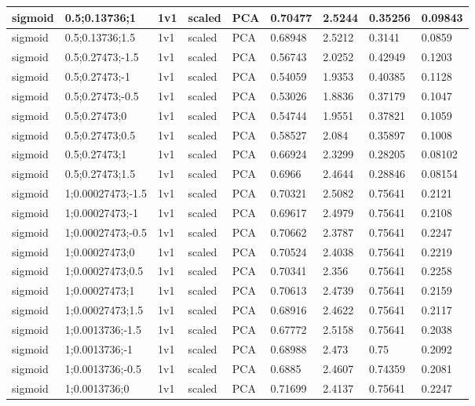 \begin{longtable}{lllllllll}
sigmoid & 0.5;0.13736;1 & 1v1 & scaled & PCA & 0.70477 & 2.5244 & 0.35256 & 0.09843\\ \hline
sigmoid & 0.5;0.13736;1.5 & 1v1 & scaled & PCA & 0.68948 & 2.5212 & 0.3141 & 0.0859\\ \hline
sigmoid & 0.5;0.27473;-1.5 & 1v1 & scaled & PCA & 0.56743 & 2.0252 & 0.42949 & 0.1203\\ \hline
sigmoid & 0.5;0.27473;-1 & 1v1 & scaled & PCA & 0.54059 & 1.9353 & 0.40385 & 0.1128\\ \hline
sigmoid & 0.5;0.27473;-0.5 & 1v1 & scaled & PCA & 0.53026 & 1.8836 & 0.37179 & 0.1047\\ \hline
sigmoid & 0.5;0.27473;0 & 1v1 & scaled & PCA & 0.54744 & 1.9551 & 0.37821 & 0.1059\\ \hline
sigmoid & 0.5;0.27473;0.5 & 1v1 & scaled & PCA & 0.58527 & 2.084 & 0.35897 & 0.1008\\ \hline
sigmoid & 0.5;0.27473;1 & 1v1 & scaled & PCA & 0.66924 & 2.3299 & 0.28205 & 0.08102\\ \hline
sigmoid & 0.5;0.27473;1.5 & 1v1 & scaled & PCA & 0.6966 & 2.4644 & 0.28846 & 0.08154\\ \hline
sigmoid & 1;0.00027473;-1.5 & 1v1 & scaled & PCA & 0.70321 & 2.5082 & 0.75641 & 0.2121\\ \hline
sigmoid & 1;0.00027473;-1 & 1v1 & scaled & PCA & 0.69617 & 2.4979 & 0.75641 & 0.2108\\ \hline
sigmoid & 1;0.00027473;-0.5 & 1v1 & scaled & PCA & 0.70662 & 2.3787 & 0.75641 & 0.2247\\ \hline
sigmoid & 1;0.00027473;0 & 1v1 & scaled & PCA & 0.70524 & 2.4038 & 0.75641 & 0.2219\\ \hline
sigmoid & 1;0.00027473;0.5 & 1v1 & scaled & PCA & 0.70341 & 2.356 & 0.75641 & 0.2258\\ \hline
sigmoid & 1;0.00027473;1 & 1v1 & scaled & PCA & 0.70613 & 2.4739 & 0.75641 & 0.2159\\ \hline
sigmoid & 1;0.00027473;1.5 & 1v1 & scaled & PCA & 0.68916 & 2.4622 & 0.75641 & 0.2117\\ \hline
sigmoid & 1;0.0013736;-1.5 & 1v1 & scaled & PCA & 0.67772 & 2.5158 & 0.75641 & 0.2038\\ \hline
sigmoid & 1;0.0013736;-1 & 1v1 & scaled & PCA & 0.68988 & 2.473 & 0.75 & 0.2092\\ \hline
sigmoid & 1;0.0013736;-0.5 & 1v1 & scaled & PCA & 0.6885 & 2.4607 & 0.74359 & 0.2081\\ \hline
sigmoid & 1;0.0013736;0 & 1v1 & scaled & PCA & 0.71699 & 2.4137 & 0.75641 & 0.2247\\ \hline

\end{longtable}
